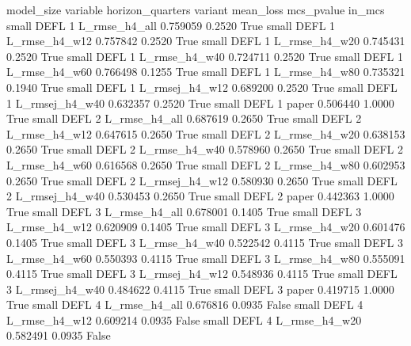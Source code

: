 model_size variable  horizon_quarters        variant  mean_loss  mcs_pvalue  in_mcs
     small     DEFL                 1  L_rmse_h4_all   0.759059      0.2520    True
     small     DEFL                 1  L_rmse_h4_w12   0.757842      0.2520    True
     small     DEFL                 1  L_rmse_h4_w20   0.745431      0.2520    True
     small     DEFL                 1  L_rmse_h4_w40   0.724711      0.2520    True
     small     DEFL                 1  L_rmse_h4_w60   0.766498      0.1255    True
     small     DEFL                 1  L_rmse_h4_w80   0.735321      0.1940    True
     small     DEFL                 1 L_rmsej_h4_w12   0.689200      0.2520    True
     small     DEFL                 1 L_rmsej_h4_w40   0.632357      0.2520    True
     small     DEFL                 1          paper   0.506440      1.0000    True
     small     DEFL                 2  L_rmse_h4_all   0.687619      0.2650    True
     small     DEFL                 2  L_rmse_h4_w12   0.647615      0.2650    True
     small     DEFL                 2  L_rmse_h4_w20   0.638153      0.2650    True
     small     DEFL                 2  L_rmse_h4_w40   0.578960      0.2650    True
     small     DEFL                 2  L_rmse_h4_w60   0.616568      0.2650    True
     small     DEFL                 2  L_rmse_h4_w80   0.602953      0.2650    True
     small     DEFL                 2 L_rmsej_h4_w12   0.580930      0.2650    True
     small     DEFL                 2 L_rmsej_h4_w40   0.530453      0.2650    True
     small     DEFL                 2          paper   0.442363      1.0000    True
     small     DEFL                 3  L_rmse_h4_all   0.678001      0.1405    True
     small     DEFL                 3  L_rmse_h4_w12   0.620909      0.1405    True
     small     DEFL                 3  L_rmse_h4_w20   0.601476      0.1405    True
     small     DEFL                 3  L_rmse_h4_w40   0.522542      0.4115    True
     small     DEFL                 3  L_rmse_h4_w60   0.550393      0.4115    True
     small     DEFL                 3  L_rmse_h4_w80   0.555091      0.4115    True
     small     DEFL                 3 L_rmsej_h4_w12   0.548936      0.4115    True
     small     DEFL                 3 L_rmsej_h4_w40   0.484622      0.4115    True
     small     DEFL                 3          paper   0.419715      1.0000    True
     small     DEFL                 4  L_rmse_h4_all   0.676816      0.0935   False
     small     DEFL                 4  L_rmse_h4_w12   0.609214      0.0935   False
     small     DEFL                 4  L_rmse_h4_w20   0.582491      0.0935   False
